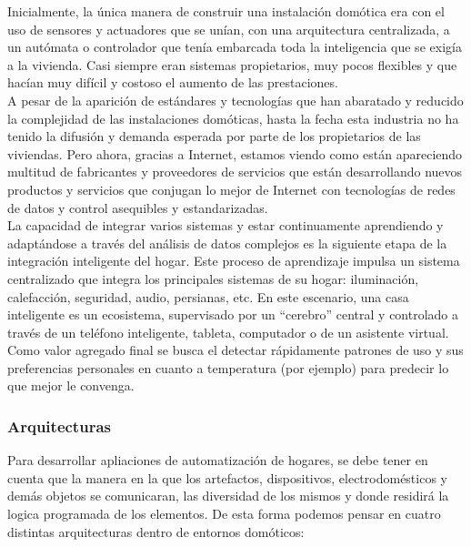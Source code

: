 Inicialmente, la única manera de construir una instalación domótica era con el uso de sensores y actuadores que se unían, con una arquitectura centralizada, a un autómata o controlador que tenía embarcada toda la inteligencia que se exigía a la vivienda. Casi siempre eran sistemas propietarios, muy pocos flexibles y que hacían muy difícil y costoso el aumento de las prestaciones.\cite{profDomotica}\\

A pesar de la aparición de estándares y tecnologías que han abaratado y reducido la complejidad de las instalaciones domóticas, hasta la fecha esta industria no ha tenido la difusión y demanda esperada por parte de los propietarios de las viviendas. Pero ahora, gracias a Internet, estamos viendo como están apareciendo multitud de fabricantes y proveedores de servicios que están desarrollando nuevos productos y servicios que conjugan lo mejor de Internet con tecnologías de redes de datos y control asequibles y estandarizadas.\\

La capacidad de integrar varios sistemas y estar continuamente aprendiendo y adaptándose a través del análisis de datos complejos es la siguiente etapa de la integración inteligente del hogar. Este proceso de aprendizaje impulsa un sistema centralizado que integra los principales sistemas de su hogar: iluminación, calefacción, seguridad, audio, persianas, etc. En este escenario, una casa inteligente es un ecosistema, supervisado por un ``cerebro'' central y controlado a través de un teléfono inteligente, tableta, computador o de un asistente virtual. Como valor agregado final se busca el detectar rápidamente patrones de uso y sus preferencias personales en cuanto a temperatura (por ejemplo) para predecir lo que mejor le convenga.\cite{ibmdomotica}

\subsubsection{Arquitecturas}
Para desarrollar apliaciones de automatización de hogares, se debe tener en cuenta que la manera en la que los artefactos, dispositivos, electrodomésticos y demás objetos se comunicaran,  las diversidad de los mismos y donde residirá la logica programada de los elementos. De esta forma podemos pensar en cuatro distintas arquitecturas dentro de entornos domóticos:

